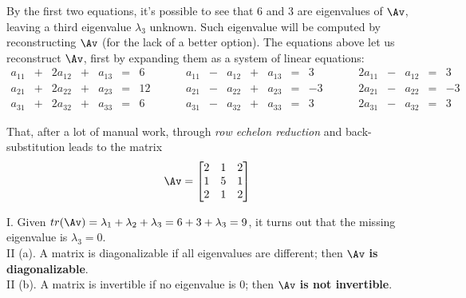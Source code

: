 \documentclass[11pt,addpoints,answers]{exam}
\numberwithin{equation}{section} %
\numberwithin{figure}{section} %
\numberwithin{table}{section} %
\newcommand{\threemat}[9]{\begin{bmatrix} #1 & #2 & #3 \\ #4 & #5 & #6 \\ #7 & #8 & #9 \end{bmatrix}}
\begin{document}
\begin{questions}
\begin{enumerate}[label=\Roman*]
    \end{enumerate}
    \begin{tcolorbox}[fit,height=8cm, width=\textwidth, blank, borderline={0.5pt}{-2pt}, valign=center, nobeforeafter]
        By the first two equations, it's possible to see that 6 and 3 are eigenvalues of $\Av$, leaving a third eigenvalue $\lambda_3$ unknown. Such eigenvalue will be computed by reconstructing $\Av$ (for the lack of a better option). The equations above let us reconstruct $\Av$, first by expanding them as a system of linear equations:
        $$
            \begin{array}{ccccccr}
                 a_{11} &+& 2a_{12} &+& a_{13} &=& 6 \\
                 a_{21} &+& 2a_{22} &+& a_{23} &=& 12 \\
                 a_{31} &+& 2a_{32} &+& a_{33} &=& 6
            \end{array}
            \hspace{1cm}
            \begin{array}{ccccccr}
                 a_{11} &-& a_{12} &+& a_{13} &=& 3 \\
                 a_{21} &-& a_{22} &+& a_{23} &=& -3 \\
                 a_{31} &-& a_{32} &+& a_{33} &=& 3
            \end{array}
            \hspace{1cm}
            \begin{array}{ccccccr}
                 2a_{11} &-& a_{12} &=& 3 \\
                 2a_{21} &-& a_{22} &=& -3 \\
                 2a_{31} &-& a_{32} &=& 3
            \end{array}
        $$

        That, after a lot of manual work, through \textit{row echelon reduction} and back-substitution leads to the matrix
        $$
            \Av = \threemat{2}{1}{2}{1}{5}{1}{2}{1}{2}
        $$

        I. Given $tr(\Av) = \lambda_1 + \lambda_2 + \lambda_3 = 6 + 3 + \lambda_3 = 9$, it turns out that the missing eigenvalue is $\lambda_3 = 0$.\\

        II (a). A matrix is diagonalizable if all eigenvalues are different; then $\Av$ \textbf{is diagonalizable}.\\
        
        II (b). A matrix is invertible if no eigenvalue is 0; then $\Av$ \textbf{is not invertible}.
    \end{tcolorbox}     
    
\end{questions}
\end{document}
